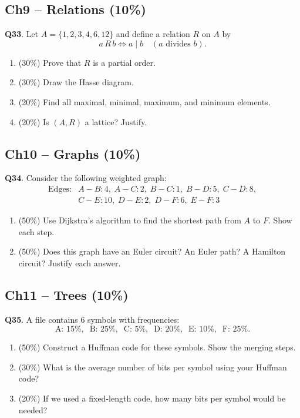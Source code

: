 \documentclass[11pt,a4paper,fontset=mac]{ctexart}
\newcommand{\question}[1]{\textbf{Q#1}.}
\begin{document}
\subsection*{Ch9 -- Relations (10\%)}

\question{33}  Let $A=\{1,2,3,4,6,12\}$ and define a relation $R$ on
$A$ by
\[
a\,R\,b \iff a\mid b \quad(\text{$a$ divides $b$}).
\]
\begin{enumerate}[label=(\alph*)]
  \item (30\%) Prove that $R$ is a partial order.
  \item (30\%) Draw the Hasse diagram.
  \item (20\%) Find all maximal, minimal, maximum, and minimum elements.
  \item (20\%) Is $(A,R)$ a lattice? Justify.
\end{enumerate}
\bigskip

\subsection*{Ch10 -- Graphs (10\%)}

\question{34}  Consider the following weighted graph:
\[
\begin{array}{ll}
\text{Edges:} &
A\!-\!B:4,\; A\!-\!C:2,\; B\!-\!C:1,\; B\!-\!D:5,\;
C\!-\!D:8,\\[2pt]
&
C\!-\!E:10,\; D\!-\!E:2,\; D\!-\!F:6,\; E\!-\!F:3
\end{array}
\]
\begin{enumerate}[label=(\alph*)]
  \item (50\%) Use Dijkstra's algorithm to find the shortest path from
        $A$ to $F$. Show each step.
  \item (50\%) Does this graph have an Euler circuit? An Euler path?
        A Hamilton circuit? Justify each answer.
\end{enumerate}
\bigskip

\subsection*{Ch11 -- Trees (10\%)}

\question{35}  A file contains 6 symbols with frequencies:
\[
\text{A: }15\%,\;\; \text{B: }25\%,\;\; \text{C: }5\%,\;\;
\text{D: }20\%,\;\; \text{E: }10\%,\;\; \text{F: }25\%.
\]
\begin{enumerate}[label=(\alph*)]
  \item (50\%) Construct a Huffman code for these symbols. Show the
        merging steps.
  \item (30\%) What is the average number of bits per symbol using your
        Huffman code?
  \item (20\%) If we used a fixed-length code, how many bits per symbol
        would be needed?
\end{enumerate}
\end{document}
